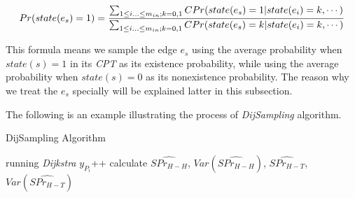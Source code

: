 \documentclass[runningheads,a4paper]{llncs}
\begin{document}
\vspace{-0.3cm}
\begin{equation}
\small{
\label{eq:margin}
Pr(state(e_s)=1)=\frac{\sum_{1\leq i\ldots\leq m_{in}; k=0,1}CPr(state(e_s)=1|state(e_i)=k,\cdots)}{\sum_{1\leq i\ldots\leq m_{in}; k=0,1}CPr(state(e_s)=k|state(e_i)=k,\cdots)}
}
\end{equation}

This formula means we sample the edge $e_s$ using the average probability when $state(s)=1$ in its \emph{CPT} as its existence probability, while using the average probability when $state(s)=0$ as its nonexistence probability. The reason why we treat the $e_s$ specially will be explained latter in this subsection.

The following is an example illustrating the process of \emph{DijSampling} algorithm.

\begin{algorithm}[htbp]
  \small{
  \caption{\small{DijSampling Algorithm}}
  \label{alg:DijSampling}
  {
     running \emph{Dijkstra} 
  $y_{P_i}$++ \;
  }
  calculate \scriptsize{$\widehat{SPr_{H-H}}$, $Var(\widehat{SPr_{H-H}})$, $\widehat{SPr_{H-T}}$, $Var(\widehat{SPr_{H-T}})$}\;
}
\end{algorithm}
\vspace{-0.6cm}
\end{document}
